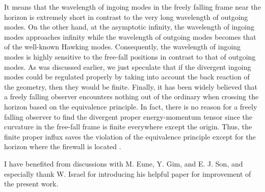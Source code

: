 \documentclass[aps,a4paper,showpacs,showkeys,superscriptaddress,12pt]{revtex4-1}
\begin{document}
It means that the wavelength of ingoing modes in the freely falling frame near the horizon
is extremely short in contrast to the very long wavelength of outgoing modes.
On the other hand, at the asymptotic infinity,
the wavelength of ingoing modes approaches infinity while the wavelength of outgoing modes becomes
that of the well-known Hawking modes.
Consequently, the wavelength of ingoing modes is highly sensitive to the free-fall positions
in contrast to that of outgoing modes. As was discussed earlier,
we just speculate that if the divergent ingoing modes
could be regulated properly by taking into account the back reaction of the
geometry, then they would be finite.
Finally, it has been widely believed that a freely falling observer
encounters nothing out of the ordinary when crossing the horizon based on the equivalence principle.
In fact, there is no reason for a freely falling observer to find the divergent proper energy-momentum tensor since
the curvature in the free-fall frame is finite everywhere except the origin.
Thus, the finite proper influx saves
the violation of the equivalence principle except for the horizon where
the firewall is located \cite{Almheiri:2012rt}.







\acknowledgments
I have benefited from discussions with M. Eune, Y. Gim, and E. J. Son, and especially thank W. Israel for introducing his
helpful paper for improvement of the present work.
\end{document}
